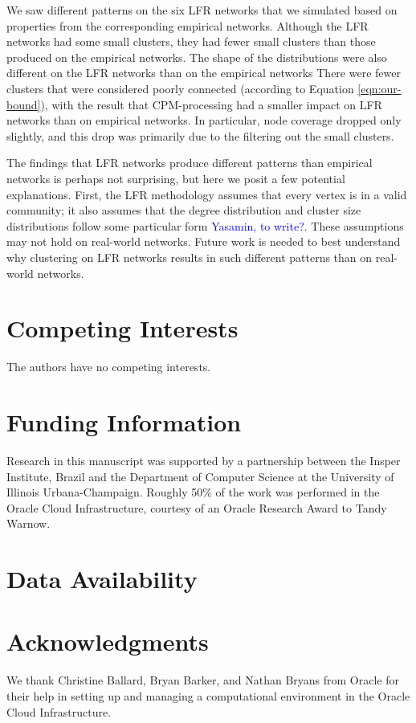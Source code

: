 \documentclass[11pt]{article}   	%
\begin{document}
We saw different patterns on the six LFR networks that we simulated based on properties from the corresponding empirical networks.
Although the LFR networks had some small clusters, they had fewer small clusters than those produced on the empirical networks.
The shape of the distributions were also different on the LFR networks than on the empirical networks There were fewer clusters that were considered poorly connected
(according to Equation \ref{eqn:our-bound}), with the result that CPM-processing had a smaller impact on LFR networks than on empirical networks.
In particular, node coverage dropped only slightly, and this drop was primarily due to the filtering out the small clusters.

The findings that LFR networks produce different patterns than empirical networks is perhaps not surprising, but here we posit a few potential explanations.
First, the LFR methodology assumes that every vertex is in a valid community; it also assumes that the degree distribution and cluster size distributions follow some
particular form \textcolor{blue}{Yasamin, to write?}.
These assumptions may not hold on real-world networks.
Future work is needed to best understand why clustering on LFR networks results in such different patterns than on real-world networks.

\section*{Competing Interests} \vspace{3mm} The authors have no competing interests.

\section*{Funding Information} Research in this manuscript was supported by a partnership between the Insper Institute, Brazil and the Department of Computer Science at the University of Illinois Urbana-Champaign. Roughly
50\% of the work was performed in the Oracle Cloud Infrastructure, courtesy of an Oracle Research Award to Tandy Warnow.

\section*{Data Availability}

\section*{Acknowledgments} We thank Christine Ballard, Bryan Barker, and Nathan Bryans from Oracle for their help in setting up and managing a computational environment in the Oracle Cloud Infrastructure.



\end{document}
